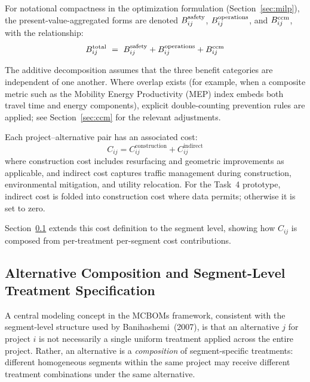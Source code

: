 For notational compactness in the optimization formulation
(Section~\ref{sec:milp}), the present-value-aggregated forms are denoted
$B^{\mathrm{safety}}_{ij}$, $B^{\mathrm{operations}}_{ij}$, and $B^{\mathrm{ccm}}_{ij}$, with the relationship:
\begin{equation*}
B^{\mathrm{total}}_{ij}\ =\ B^{\mathrm{safety}}_{ij} + B^{\mathrm{operations}}_{ij} + B^{\mathrm{ccm}}_{ij}
\end{equation*}

The additive decomposition assumes that the three benefit categories are
independent of one another. Where overlap exists (for example, when a composite
metric such as the Mobility Energy Productivity (MEP) index embeds both travel
time and energy components), explicit double-counting prevention rules are
applied; see Section~\ref{sec:ccm} for the relevant adjustments.

Each project--alternative pair has an associated cost:
\begin{equation}
C_{ij} = C_{ij}^{\mathrm{construction}} + C_{ij}^{\mathrm{indirect}}
\end{equation}
\noindent where construction cost includes resurfacing and geometric
improvements as applicable, and indirect cost captures traffic management
during construction, environmental mitigation, and utility relocation. For the
Task~4 prototype, indirect cost is folded into construction cost where data
permits; otherwise it is set to zero.

Section~\ref{sec:alt-composition} extends this cost definition to the
segment level, showing how $C_{ij}$ is composed from per-treatment
per-segment cost contributions.

\subsection{Alternative Composition and Segment-Level Treatment Specification}
\label{sec:alt-composition}

A central modeling concept in the MCBOMs framework, consistent with the
segment-level structure used by Banihashemi~(2007), is that an alternative
$j$ for project $i$ is not necessarily a single uniform treatment applied
across the entire project. Rather, an alternative is a \emph{composition}
of segment-specific treatments: different homogeneous segments within the
same project may receive different treatment combinations under the same
alternative.

